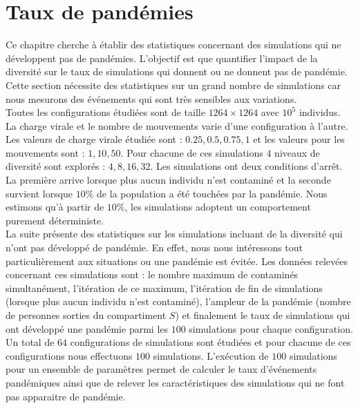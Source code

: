 \section{Taux de pandémies}

Ce chapitre cherche à établir des statistiques concernant des simulations qui ne développent pas de pandémies. L'objectif est que quantifier l'impact de la diversité sur le taux de simulations qui donnent ou ne donnent pas de pandémie. Cette section nécessite des statistiques sur un grand nombre de simulations car nous mesurons des événements qui sont très sensibles aux variations.\\

Toutes les configurations étudiées sont de taille $1264 \times 1264$ avec $10^5$ individus. La charge virale et le nombre de mouvements varie d’une configuration à l’autre. Les valeurs de charge virale étudiée sont : $0.25,0.5,0.75,1$ et les valeurs pour les mouvements sont : $1,10,50$. Pour chacune de ces simulations $4$ niveaux de diversité sont explorés : $4,8,16,32$. Les simulations ont deux conditions d'arrêt. La première arrive lorsque plus aucun individu n'est contaminé et la seconde survient lorsque $10\%$ de la population a été touchées par la pandémie. Nous estimons qu'à partir de $10\%$, les simulations adoptent un comportement purement déterministe.\\ 

La suite présente des statistiques sur les simulations incluant de la diversité qui n'ont pas développé de pandémie. En effet, nous nous intéressons tout particulièrement aux situations ou une pandémie est évitée. Les données relevées concernant ces simulations sont : le nombre maximum de contaminés simultanément, l'itération de ce maximum, l'itération de fin de simulations (lorsque plus aucun individu n'est contaminé), l'ampleur de la pandémie (nombre de personnes sorties du compartiment $S$) et finalement le taux de simulations qui ont développé une pandémie parmi les $100$ simulations pour chaque configuration.\\

Un total de $64$ configurations de simulations sont étudiées et pour chacune de ces configurations nous effectuons $100$ simulations. L'exécution de $100$ simulations pour un ensemble de paramètres permet de calculer le taux d'événements pandémiques ainsi que de relever les caractéristiques des simulations qui ne font pas apparaitre de pandémie.

